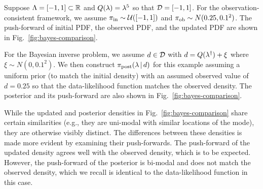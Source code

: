 \begin{ex}
Suppose ${\Lambda} = [-1,1]\subset\mathbb{R}$ and $Q(\lambda)=\lambda^5$ so that $\mathcal{D} = [-1,1]$.
For the observation-consistent framework, we assume $\operatorname*{\pi_{in}}\sim \mathcal{U}([-1,1])$ and $\operatorname*{\pi_{ob}}\sim N(0.25,0.1^2)$.
The push-forward of initial PDF, the observed PDF, and the updated PDF are shown in Fig.~\ref{fig:bayes-comparison}.

For the Bayesian inverse problem, we assume $d\in \mathcal{D}$ with $d=Q(\lambda^\dagger)+\xi$ where $\xi\sim N(0,0.1^2)$.
We then construct $\pi_{\text{post}}(\lambda \, |\, d)$ for this example assuming a uniform prior (to match the initial density) with an assumed observed value of $d=0.25$ so that the data-likelihood function matches the observed density.
The posterior and its push-forward are also shown in Fig.~\ref{fig:bayes-comparison}.

While the updated and posterior densities in Fig.~\ref{fig:bayes-comparison} share certain similarities (e.g., they are uni-modal with similar locations of the mode), they are otherwise visibly distinct.
The differences between these densities is made more evident by examining their push-forwards.
The push-forward of the updated density agrees well with the observed density, which is to be expected.
However, the push-forward of the posterior is bi-modal and does not match the observed density, which we recall is identical to the data-likelihood function in this case.

%



\end{ex}
